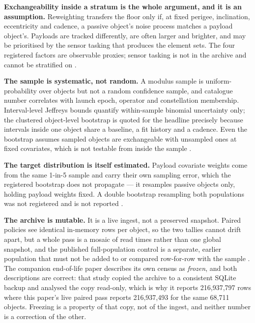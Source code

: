 \documentclass[11pt]{article}
\begin{document}
\textbf{Exchangeability inside a stratum is the whole argument, and it is an assumption.} Reweighting transfers the floor only if, at fixed perigee, inclination, eccentricity and cadence, a passive object's noise process matches a payload object's. Payloads are tracked differently, are often larger and brighter, and may be prioritised by the sensor tasking that produces the element sets. The four registered factors are observable proxies; sensor tasking is not in the archive and cannot be stratified on%
.

\textbf{The sample is systematic, not random.} A modulus sample is uniform-probability over objects but not a random confidence sample, and catalogue number correlates with launch epoch, operator and constellation membership. Interval-level Jeffreys bounds quantify within-sample binomial uncertainty only; the clustered object-level bootstrap is quoted for the headline precisely because intervals inside one object share a baseline, a fit history and a cadence. Even the bootstrap assumes sampled objects are exchangeable with unsampled ones at fixed covariates, which is not testable from inside the sample%
.

\textbf{The target distribution is itself estimated.} Payload covariate weights come from the same 1-in-5 sample and carry their own sampling error, which the registered bootstrap does not propagate --- it resamples passive objects only, holding payload weights fixed. A double bootstrap resampling both populations was not registered and is not reported%
.

\textbf{The archive is mutable.} It is a live ingest, not a preserved snapshot. Paired policies see identical in-memory rows per object, so the two tallies cannot drift apart, but a whole pass is a mosaic of read times rather than one global snapshot, and the published full-population control is a separate, earlier population that must not be added to or compared row-for-row with the sample%
. The companion end-of-life paper describes its own census as \emph{frozen}, and both descriptions are correct: that study copied the archive to a consistent SQLite backup and analysed the copy read-only, which is why it reports 216,937,797 rows where this paper's live paired pass reports 216,937,493 for the same 68,711 objects. Freezing is a property of that copy, not of the ingest, and neither number is a correction of the other.
\end{document}
